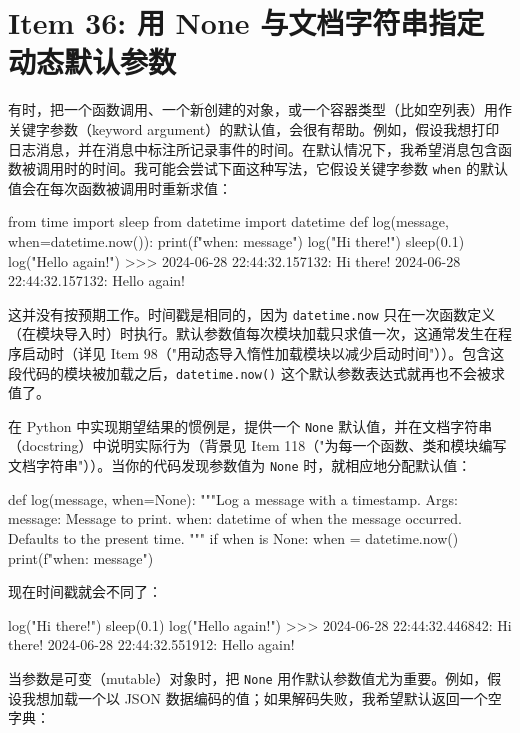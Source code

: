 \section{Item 36: 用 None 与文档字符串指定动态默认参数}

有时，把一个函数调用、一个新创建的对象，或一个容器类型（比如空列表）用作关键字参数（keyword argument）的默认值，会很有帮助。例如，假设我想打印日志消息，并在消息中标注所记录事件的时间。在默认情况下，我希望消息包含函数被调用时的时间。我可能会尝试下面这种写法，它假设关键字参数 \texttt{when} 的默认值会在每次函数被调用时重新求值：

\begin{codebox}[python]
from time import sleep
from datetime import datetime
def log(message, when=datetime.now()):
    print(f"{when}: {message}")
log("Hi there!")
sleep(0.1)
log("Hello again!")
>>>
2024-06-28 22:44:32.157132: Hi there!
2024-06-28 22:44:32.157132: Hello again!
\end{codebox}

这并没有按预期工作。时间戳是相同的，因为 \texttt{datetime.now} 只在一次函数定义（在模块导入时）时执行。默认参数值每次模块加载只求值一次，这通常发生在程序启动时（详见 Item 98（"用动态导入惰性加载模块以减少启动时间"））。包含这段代码的模块被加载之后，\texttt{datetime.now()} 这个默认参数表达式就再也不会被求值了。

在 Python 中实现期望结果的惯例是，提供一个 \texttt{None} 默认值，并在文档字符串（docstring）中说明实际行为（背景见 Item 118（"为每一个函数、类和模块编写文档字符串"））。当你的代码发现参数值为 \texttt{None} 时，就相应地分配默认值：

\begin{codebox}[python]
def log(message, when=None):
    """Log a message with a timestamp.
    Args:
        message: Message to print.
        when: datetime of when the message occurred.
            Defaults to the present time.
    """
    if when is None:
        when = datetime.now()
    print(f"{when}: {message}")
\end{codebox}

现在时间戳就会不同了：

\begin{codebox}[python]
log("Hi there!")
sleep(0.1)
log("Hello again!")
>>>
2024-06-28 22:44:32.446842: Hi there!
2024-06-28 22:44:32.551912: Hello again!
\end{codebox}

当参数是可变（mutable）对象时，把 \texttt{None} 用作默认参数值尤为重要。例如，假设我想加载一个以 JSON 数据编码的值；如果解码失败，我希望默认返回一个空字典：

